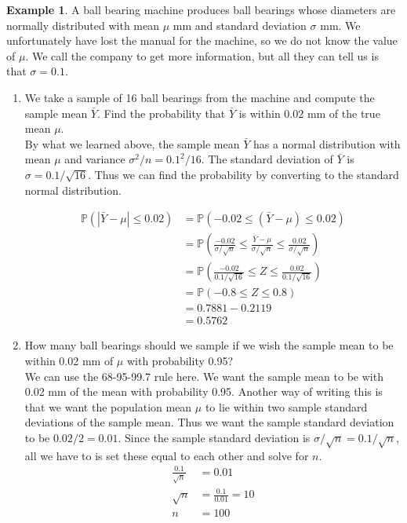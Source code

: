 \documentclass[12pt]{article}
\theoremstyle{definition}
\newtheorem*{example}{Example}
\theoremstyle{remark}
\def\P{{\mathbb P}}
\begin{document}
\begin{example}A ball bearing machine produces ball bearings whose diameters are normally distributed with mean $
\mu$ mm and standard deviation $\sigma$ mm. We unfortunately have lost the manual for the machine, so we do not know the value of $\mu$. We call the company to get more information, but all they can tell us is that $\sigma = 0.1$. 

\begin{enumerate}
\item We take a sample of 16 ball bearings from the machine and compute the sample mean $\bar{Y}$. Find the probability that $\bar{Y}$ is within 0.02 mm of the true mean $\mu$.\\


By what we learned above, the sample mean $\bar{Y}$ has a normal distribution with mean $\mu$ and variance $\sigma^2 / n = 0.1^2 / 16$. The standard deviation of $\bar{Y}$ is $\sigma = 0.1 / \sqrt{16}$. Thus we can find the probability by converting to the standard normal distribution.

\begin{align*}
\P( |\bar{Y} - \mu| \leq 0.02) &= \P( -0.02 \leq (\bar{Y} - \mu) \leq 0.02 ) \\
&= \P\left( \frac{-0.02}{\sigma/\sqrt{n}} \leq \frac{\bar{Y} - \mu}{\sigma/\sqrt{n}} \leq \frac{0.02}{\sigma/\sqrt{n}}  \right) \\
&= \P\left( \frac{-0.02}{0.1/\sqrt{16}} \leq Z \leq \frac{0.02}{0.1/\sqrt{16}} \right)\\
&= \P(-0.8 \leq Z \leq 0.8) \\
&= 0.7881 - 0.2119\\
&= 0.5762
\end{align*}

\item How many ball bearings should we sample if we wish the sample mean to be within 0.02 mm of $\mu$ with probability 0.95?\\

We can use the 68-95-99.7 rule here. We want the sample mean to be with 0.02 mm of the mean with probability 0.95. Another way of writing this is that we want the population mean $\mu$ to lie within two sample standard deviations of the sample mean. Thus we want the sample standard deviation to be $0.02 / 2 = 0.01$. Since the sample standard deviation is $\sigma / \sqrt{n} = 0.1 / \sqrt{n}$, all we have to is set these equal to each other and solve for $n$.
\begin{align*}
\frac{0.1}{\sqrt{n}} &= 0.01 \\
\sqrt{n} &= \frac{0.1}{0.01} = 10 \\
n &= 100
\end{align*} 


\end{enumerate}
\end{example}
\end{document}
